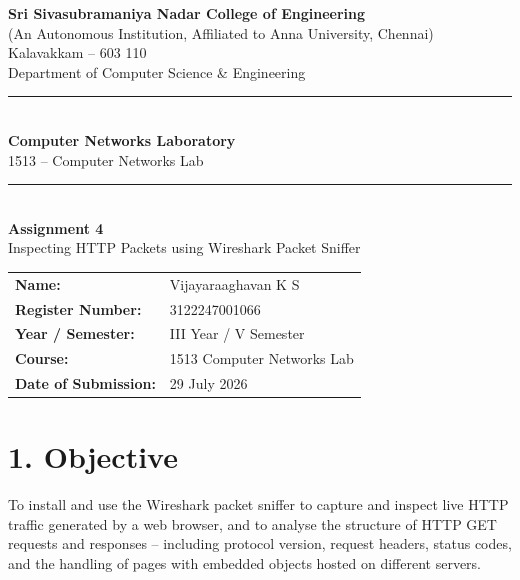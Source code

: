 \documentclass[11pt]{article}
\title{\vspace{-2cm}}
\date{}
\begin{document}
\begin{titlepage}
\centering
\vspace*{1cm}
{\large \textbf{Sri Sivasubramaniya Nadar College of Engineering}}\\
{\small (An Autonomous Institution, Affiliated to Anna University, Chennai)}\\
{\small Kalavakkam -- 603 110}\\[0.3cm]
{\small Department of Computer Science \& Engineering}\\[1.5cm]

\rule{\linewidth}{0.5mm}\\[0.4cm]
{\LARGE \textbf{Computer Networks Laboratory}}\\[0.3cm]
{\Large 1513 -- Computer Networks Lab}\\[0.4cm]
\rule{\linewidth}{0.5mm}\\[1.5cm]

{\huge \textbf{Assignment 4}}\\[0.4cm]
{\Large Inspecting HTTP Packets using Wireshark Packet Sniffer}\\[2cm]

\begin{center}
\begin{tabular}{ll}
\textbf{Name:} & Vijayaraaghavan K S \\[0.2cm]
\textbf{Register Number:} & 3122247001066 \\[0.2cm]
\textbf{Year / Semester:} & III Year / V Semester \\[0.2cm]
\textbf{Course:} & 1513 Computer Networks Lab \\[0.2cm]
\textbf{Date of Submission:} & 29 July 2026 \\[0.2cm]
\end{tabular}
\end{center}

\vfill
\end{titlepage}

\section*{1. Objective}
To install and use the Wireshark packet sniffer to capture and inspect live HTTP traffic
generated by a web browser, and to analyse the structure of HTTP GET requests and responses --
including protocol version, request headers, status codes, and the handling of pages with
embedded objects hosted on different servers.
\end{document}
